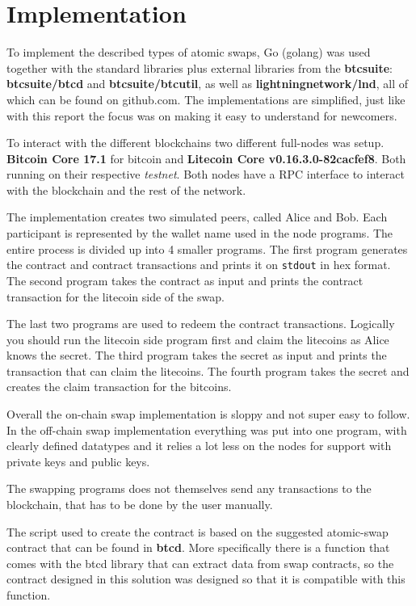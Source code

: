 \chapter{Implementation}
To implement the described types of atomic swaps, Go (golang) was used 
together with the standard libraries plus external libraries from the 
\textbf{btcsuite}: \textbf{btcsuite/btcd} and \textbf{btcsuite/btcutil}, 
as well as \textbf{lightningnetwork/lnd}, all of which can be found 
on github.com. The implementations are simplified, just like with 
this report the focus was on making it easy to understand for newcomers. 

To interact with the different blockchains two different full-nodes 
was setup. \textbf{Bitcoin Core 17.1} for bitcoin and 
\textbf{Litecoin Core  v0.16.3.0-82cacfef8}. Both running on their 
respective \textit{testnet}. Both nodes have a RPC interface to interact 
with the blockchain and the rest of the network. 

The implementation creates two simulated peers, called Alice and Bob. 
Each participant is represented by the wallet name used in the node
programs. The entire process is divided up into 4 smaller programs.
The first program generates the contract and contract transactions and 
prints it on \texttt{stdout} in hex format. The second program takes 
the contract as input and prints the contract transaction for the 
litecoin side of the swap. 

The last two programs are used to redeem the contract transactions.
Logically you should run the litecoin side program first and
claim the litecoins as Alice knows the secret. The third program
takes the secret as input and prints the transaction that can
claim the litecoins. The fourth program takes the secret and creates 
the claim transaction for the bitcoins. 

Overall the on-chain swap implementation is sloppy and not super easy to follow. 
In the off-chain swap implementation everything was put into one program, with 
clearly defined datatypes and it relies a lot less on the nodes for support 
with private keys and public keys.

The swapping programs does not themselves send any transactions to the blockchain,
that has to be done by the user manually. 

The script used to create the contract is based on the suggested atomic-swap 
contract that can be found in \textbf{btcd}. More specifically there 
is a function that comes with the btcd library that can extract data from 
swap contracts, so the contract designed in this solution was designed so that
it is compatible with this function. 

